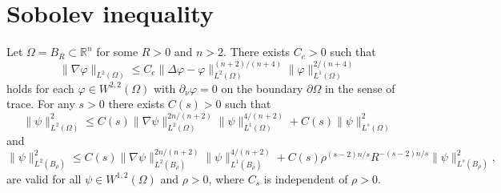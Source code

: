 \section{Sobolev inequality}

\begin{lemma}
  \label{le: gninequality}
  Let $\Omega = B_R\subset\mathbb R^n$ for some $R>0$ and $n>2$.
  There exists $C_e > 0$ such that 
  \begin{equation}
    \label{eq: grad gn e}
    \|\nabla \varphi\|_{L^2(\Omega)} 
    \leq C_e \|\Delta \varphi - \varphi\|_{L^2(\Omega)}^{(n+2)/(n+4)} 
    \|\varphi\|_{L^1(\Omega)}^{2/(n+4)}
  \end{equation}
  holds for each $\varphi\in W^{2,2}(\Omega)$ 
  with $\partial_\nu \varphi = 0$ on the boundary $\partial\Omega$ in the sense of trace.  
  For any $s>0$ there exists $C(s) > 0$ such that 
  \begin{equation}
    \label{eq: L2 gn}
    \|\psi\|_{L^2(\Omega)}^2
    \leq C(s) \|\nabla \psi\|_{L^2(\Omega)}^{2n/(n+2)}\|\psi\|_{L^1(\Omega)}^{4/(n+2)} 
    + C(s)\|\psi\|_{L^s(\Omega)}^2
  \end{equation}
  and 
  \begin{equation}
    \label{eq: L2 gn rho}
    \|\psi\|_{L^2(B_\rho)}^2 
    \leq C(s) \|\nabla \psi\|_{L^2(B_\rho)}^{2n/(n+2)}\|\psi\|_{L^1(B_\rho)}^{4/(n+2)} 
    + C(s)\rho^{(s-2)n/s}R^{-(s-2)n/s}\|\psi\|_{L^{s}(B_\rho)}^2,
  \end{equation}
  are valid for all $\psi\in W^{1,2}(\Omega)$ and $\rho > 0$, 
  where $C_{s}$ is independent of $\rho > 0$.
\end{lemma}

